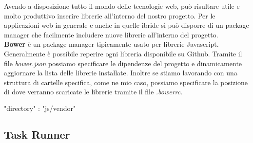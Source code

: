 Avendo a disposizione tutto il mondo delle tecnologie web, può risultare utile e molto produttivo inserire librerie all'interno del nostro progetto. Per le applicazioni web in generale e anche in quelle ibride si può disporre di un package manager che facilmente includere nuove librerie all'interno del progetto.\\

\textbf{Bower} è un package manager tipicamente usato per librerie Javascript. Generalmente è possibile reperire ogni libreria disponibile su Github. Tramite il file \emph{bower.json} possiamo specificare le dipendenze del progetto e dinamicamente aggiornare la lista delle librerie installate. Inoltre se stiamo lavorando con una struttura di cartelle specifica, come ne mio caso, possiamo specificare la posizione di dove verranno scaricate le librerie tramite il file \emph{.bowerrc}. 

\begin{code}[language=html,caption={Una tipica configurazione del file .bowerrc},
				   label={lst:bowerrc}]
	{
		"directory" : "js/vendor"
	}
\end{code}



\subsection{Task Runner}

